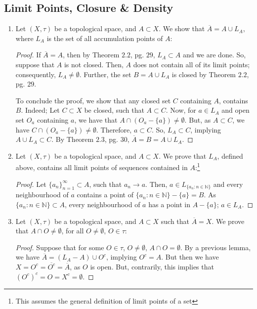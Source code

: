 \documentclass{book}
\begin{document}
\subsection{Limit Points, Closure \& Density}
\begin{enumerate}[(1)]

    \item Let $(X, \tau)$ be a topological space, and $A \subset X$. We show that $\overline{A} = A \cup L_A$, where $L_A$ is the set of all accumulation points of $A$:
        \begin{proof} If $\overline{A} = A$, then by Theorem $2.2$, pg. $29$, $L_A \subset A$ and we are done. So, suppose that $A$ is not closed. Then, $A$ does not contain all of its limit points; consequently, $L_A \neq \emptyset$. Further, the set $B = A \cup L_A$ is closed by Theorem $2.2$, pg. $29$. 
            \par To conclude the proof, we show that any closed set $C$ containing $A$, contains $B$. Indeed; Let $C \subset X$ be closed, such that $A \subset C$. Now, for $a \in L_A$ and open set $O_a$ containing $a$, we have that $A \cap (O_a - \{a\}) \neq \emptyset$. But, as $A \subset C$, we have $C \cap (O_a - \{a\}) \neq \emptyset$. Therefore, $a \subset C$. So, $L_A \subset C$, implying $A \cup L_A \subset C$. By Theorem $2.3$, pg. $30$, $\overline{A} = B = A \cup L_A$.
        \end{proof}

    \item Let $(X, \tau)$ be a topological space, and $A \subset X$. We prove that $L_A$, defined above, contains all limit points of sequences contained in $A$:\footnote{This assumes the general definition of limit points of a set}
        \begin{proof} Let $\{a_n\}_{n=1}^\infty \subset A$, such that $a_n \rightarrow a$. Then, $a \in L_{\{a_n: n \in \mathbb{N}\}}$ and every neighbourhood of $a$ contains a point of $\{a_n: n \in \mathbb{N}\} - \{a\} = B$. As $\{a_n: n \in \mathbb{N}\} \subset A$, every neighbourhood of $a$ has a point in $A - \{a\}$; $a \in L_A$. 
        \end{proof}

    \item Let $(X, \tau)$ be a topological space, and $A \subset X$ such that $\overline{A} = X$. We prove that $A \cap O \neq \emptyset$, for all $O \neq \emptyset$, $O \in \tau$: 
        \begin{proof} Suppose that for some $O \in \tau$, $O \neq \emptyset$, $A \cap O = \emptyset$. By a previous lemma, we have $\overline{A} = (L_A - A) \cup O^c$, implying $O^c = A$. But then we have $X = O^c = \overline{O^c} = \overline{A}$, as $O$ is open. But, contrarily, this implies that $(O^c)^c = O = X^c = \emptyset$.  
        \end{proof}


\end{enumerate}
\end{document}
